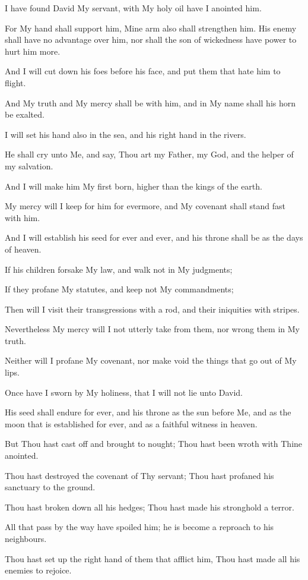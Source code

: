 I have found David My servant, with My holy oil have I anointed him.

For My hand shall support him, Mine arm also shall strengthen him. His enemy shall have no advantage over him, nor shall the son of wickedness have power to hurt him more.

And I will cut down his foes before his face, and put them that hate him to flight.

And My truth and My mercy shall be with him, and in My name shall his horn be exalted.

I will set his hand also in the sea, and his right hand in the rivers.

He shall cry unto Me, and say, Thou art my Father, my God, and the helper of my salvation.

And I will make him My first born, higher than the kings of the earth.

My mercy will I keep for him for evermore, and My covenant shall stand fast with him.

And I will establish his seed for ever and ever, and his throne shall be as the days of heaven.

If his children forsake My law, and walk not in My judgments;

If they profane My statutes, and keep not My commandments;

Then will I visit their transgressions with a rod, and their iniquities with stripes.

Nevertheless My mercy will I not utterly take from them, nor wrong them in My truth.

Neither will I profane My covenant, nor make void the things that go out of My lips.

Once have I sworn by My holiness, that I will not lie unto David.

His seed shall endure for ever, and his throne as the sun before Me, and as the moon that is established for ever, and as a faithful witness in heaven.

But Thou hast cast off and brought to nought; Thou hast been wroth with Thine anointed.

Thou hast destroyed the covenant of Thy servant; Thou hast profaned his sanctuary to the ground.

Thou hast broken down all his hedges; Thou hast made his stronghold a terror.

All that pass by the way have spoiled him; he is become a reproach to his neighbours.

Thou hast set up the right hand of them that afflict him, Thou hast made all his enemies to rejoice.

